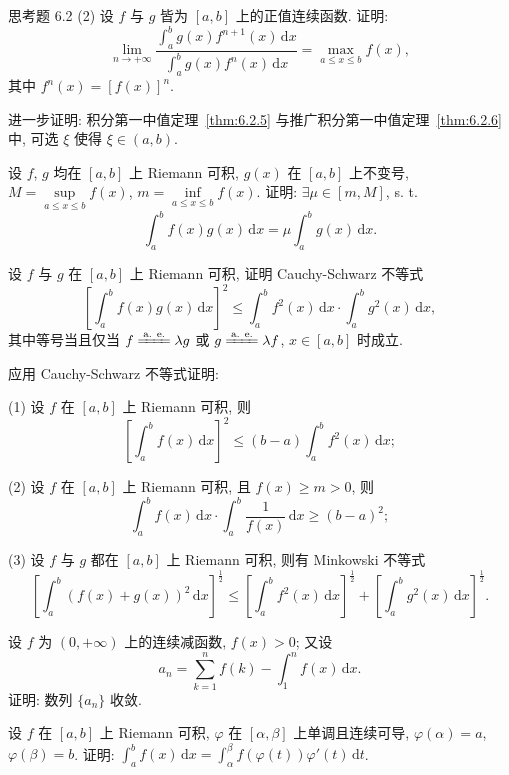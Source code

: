 \begin{exblock}{思考题 6.2}
  (2) 设 $f$ 与 $g$ 皆为 $[a,b]$ 上的正值连续函数. 证明:
  \[
  \lim_{n\to+\infty}\frac{\displaystyle\int_{a}^{b}g(x)f^{n+1}(x)\,\mathrm{d}x}{\displaystyle\int_{a}^{b}g(x)f^{n}(x)\,\mathrm{d}x}=\max_{a\leqslant x\leqslant b}f(x),
\]
  其中 $f^{n}(x)=[f(x)]^{n}$.

  \item 进一步证明: 积分第一中值定理~\ref{thm:6.2.5} 与推广积分第一中值定理~\ref{thm:6.2.6} 中, 可选 $\xi$ 使得 $\xi\in(a,b)$.

  \item 设 $f$, $g$ 均在 $[a,b]$ 上 Riemann 可积, $g(x)$ 在 $[a,b]$ 上不变号, $M=\sup\limits_{a\leqslant x\leqslant b}f(x)$, $m=\inf\limits_{a\leqslant x\leqslant b}f(x)$. 证明: $\exists\mu\in[m,M]$, s. t.
  \[
  \int_{a}^{b}f(x)g(x)\,\mathrm{d}x=\mu\int_{a}^{b}g(x)\,\mathrm{d}x.
\]

  \item 设 $f$ 与 $g$ 在 $[a,b]$ 上 Riemann 可积, 证明 Cauchy-Schwarz 不等式
  \[
  \left[\int_{a}^{b}f(x)g(x)\,\mathrm{d}x\right]^{2}\leqslant\int_{a}^{b}f^{2}(x)\,\mathrm{d}x\cdot\int_{a}^{b}g^{2}(x)\,\mathrm{d}x,
\]
  其中等号当且仅当 $f\xlongequal{\text{a. e.}}\lambda g$ 或 $g\xlongequal{\text{a. e.}}\lambda f$, $x\in[a,b]$ 时成立.

  \item 应用 Cauchy-Schwarz 不等式证明:

  (1) 设 $f$ 在 $[a,b]$ 上 Riemann 可积, 则
  \[
  \left[\int_{a}^{b}f(x)\,\mathrm{d}x\right]^{2}\leqslant(b-a)\int_{a}^{b}f^{2}(x)\,\mathrm{d}x;
\]

  (2) 设 $f$ 在 $[a,b]$ 上 Riemann 可积, 且 $f(x)\geqslant m>0$, 则
  \[
  \int_{a}^{b}f(x)\,\mathrm{d}x\cdot\int_{a}^{b}\frac{1}{f(x)}\,\mathrm{d}x\geqslant(b-a)^{2};
\]

  (3) 设 $f$ 与 $g$ 都在 $[a,b]$ 上 Riemann 可积, 则有 Minkowski 不等式
  \[
  \left[\int_{a}^{b}(f(x)+g(x))^{2}\,\mathrm{d}x\right]^{\frac{1}{2}}\leqslant\left[\int_{a}^{b}f^{2}(x)\,\mathrm{d}x\right]^{\frac{1}{2}}+\left[\int_{a}^{b}g^{2}(x)\,\mathrm{d}x\right]^{\frac{1}{2}}.
\]

  \item 设 $f$ 为 $(0,+\infty)$ 上的连续减函数, $f(x)>0$; 又设
  \[
  a_{n}=\sum_{k=1}^{n}f(k)-\int_{1}^{n}f(x)\,\mathrm{d}x.
\]
  证明: 数列 $\{a_{n}\}$ 收敛.

  \item 设 $f$ 在 $[a,b]$ 上 Riemann 可积, $\varphi$ 在 $[\alpha,\beta]$ 上单调且连续可导, $\varphi(\alpha)=a$, $\varphi(\beta)=b$.
  证明: $\int_{a}^{b}f(x)\,\mathrm{d}x=\int_{\alpha}^{\beta}f(\varphi(t))\varphi'(t)\,\mathrm{d}t$.


\end{exblock}
